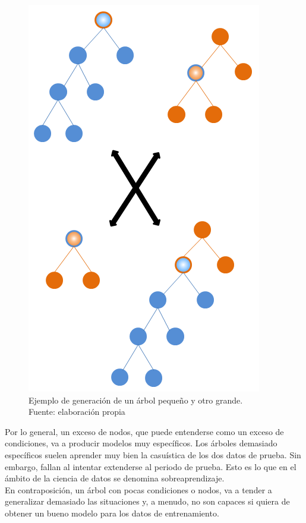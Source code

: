      	\begin{figure}[H]
     		\centering
     		\includegraphics[scale=0.4]{imagenes/small_crossover.png}
     		\caption[Ejemplo de generaci\'on de un \'arbol peque\~no]{Ejemplo de generaci\'on de un \'arbol peque\~no y otro grande.\\ Fuente: elaboraci\'on propia}
     		\label{fig:small_crossover}
     	\end{figure}


Por lo general, un exceso de nodos, que puede entenderse como un exceso de condiciones, va a producir modelos muy espec\'ificos. Los \'arboles demasiado espec\'ificos suelen aprender muy bien la casu\'istica de los dos datos de prueba. Sin embargo, fallan al intentar extenderse al periodo de prueba. Esto es lo que en el \'ambito de la ciencia de datos se denomina sobreaprendizaje.\\

En contraposici\'on, un \'arbol con pocas condiciones o nodos, va a tender a generalizar demasiado las situaciones y, a menudo, no son capaces si quiera de obtener un bueno modelo para los datos de entrenamiento.\\

